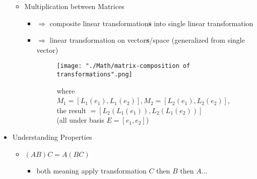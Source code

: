 \begin{itemize}
\begin{itemize}
\begin{itemize}
		\end{itemize}
	\item Multiplication between Matrices
		\begin{itemize}
		\item $\Rightarrow$ composite linear transformation\textbf{s} into single linear transformation
		\item $\Rightarrow$ linear transformation on vector\textbf{s}/space (generalized from single vector)
		\begin{figure}[ht]
		\texttt{[image: "./Math/matrix-composition of transformations".png]}
		\caption*{where $M_1=[L_1(e_1), L_1(e_2)], M_2=[L_2(e_1), L_2(e_2)]$, the result $=[L_2(L_1(e_1)), L_2(L_1(e_2))]$ \\ (all under basis $E=[e_1,e_2]$)}
		\end{figure}
		\end{itemize}
	\end{itemize}
	
\item Understanding Properties
	\begin{itemize}
		\item $(AB)C = A(BC)$
		\begin{itemize}
			\item both meaning apply transformation $C$ then $B$ then $A$...
		\end{itemize}
	\end{itemize}
\end{itemize}


